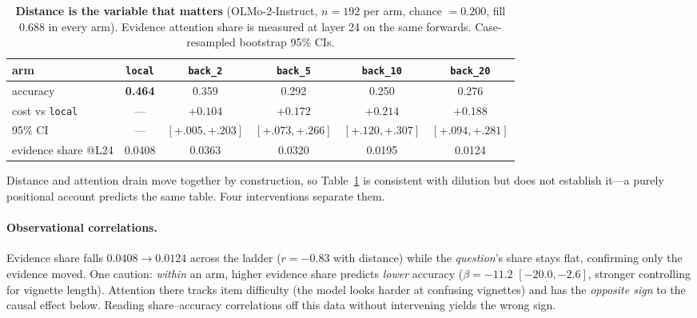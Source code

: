 \documentclass{article}
\begin{document}
\begin{table}[t]
  \centering\small
  \caption{\textbf{Distance is the variable that matters} (OLMo-2-Instruct, $n{=}192$ per arm,
  chance $=0.200$, fill $0.688$ in every arm). Evidence attention share is measured at layer 24 on
  the same forwards. Case-resampled bootstrap 95\% CIs.}
  \label{tab:distance}
  \setlength{\tabcolsep}{4.5pt}
  \begin{tabular}{lccccc}
    \toprule
    arm & \texttt{local} & \texttt{back\_2} & \texttt{back\_5} & \texttt{back\_10} & \texttt{back\_20}\\
    \midrule
    accuracy & \textbf{0.464} & 0.359 & 0.292 & 0.250 & 0.276\\
    cost vs \texttt{local} & --- & $+0.104$ & $+0.172$ & $+0.214$ & $+0.188$\\
    95\% CI & --- & $[+.005,+.203]$ & $[+.073,+.266]$ & $[+.120,+.307]$ & $[+.094,+.281]$\\
    evidence share @L24 & 0.0408 & 0.0363 & 0.0320 & 0.0195 & 0.0124\\
    \bottomrule
  \end{tabular}
\end{table}

Distance and attention drain move together by construction, so Table~\ref{tab:distance} is
consistent with dilution but does not establish it---a purely positional account predicts the same
table. Four interventions separate them.

\paragraph{Observational correlations.}
Evidence share falls $0.0408\to0.0124$ across the ladder ($r=-0.83$ with distance) while the
\emph{question}'s share stays flat, confirming only the evidence moved. One caution:
\emph{within} an arm, higher evidence share predicts \emph{lower} accuracy
($\beta=-11.2$ $[-20.0,-2.6]$, stronger controlling for vignette length). Attention there tracks
item difficulty (the model looks harder at confusing vignettes) and has the \emph{opposite sign}
to the causal effect below. Reading share--accuracy correlations off this data without
intervening yields the wrong sign.
\end{document}
